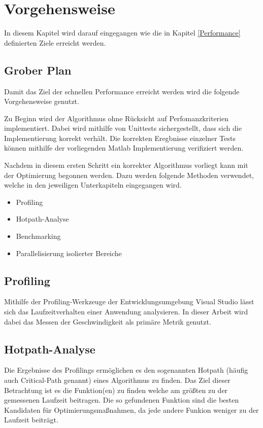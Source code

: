 \chapter{Vorgehensweise}

In diesem Kapitel wird darauf eingegangen wie die in Kapitel \ref{Performance} definierten Ziele erreicht werden.


\section{Grober Plan}

Damit das Ziel der schnellen Performance erreicht werden wird die folgende Vorgehensweise genutzt.

Zu Beginn wird der Algorithmus ohne Rücksicht auf Perfomanzkriterien implementiert.
Dabei wird mithilfe von Unittests sichergestellt, dass sich die Implementierung korrekt verhält. 
Die korrekten Eregbnisse einzelner Tests können mithilfe der vorliegenden Matlab Implementierung verifiziert werden.

Nachdem in diesem ersten Schritt ein korrekter Algorithmus vorliegt kann mit der Optimierung begonnen werden.
Dazu werden folgende Methoden verwendet, welche in den jeweiligen Unterkapiteln eingegangen wird.

\begin{itemize}
    \item Profiling
    \item Hotpath-Analyse
    \item Benchmarking
    \item Parallelisierung isolierter Bereiche
\end{itemize}

\section{Profiling}

Mithilfe der Profiling-Werkzeuge der Entwicklungsumgebung Visual Studio lässt sich das Laufzeitverhalten einer Anwendung analysieren.
In dieser Arbeit wird dabei das Messen der Geschwindigkeit als primäre Metrik genutzt. 


\section{Hotpath-Analyse}

Die Ergebnisse des Profilings ermöglichen es den sogenannten Hotpath (häufig auch Critical-Path genannt) eines Algorithmus zu finden.
Das Ziel dieser Betrachtung ist es die Funktion(en) zu finden welche am größten zu der gemessenen Laufzeit beitragen. 
Die so gefundenen Funktion sind die besten Kandidaten für Optimierungsmaßnahmen, da jede andere Funkion weniger zu der Laufzeit beiträgt.


